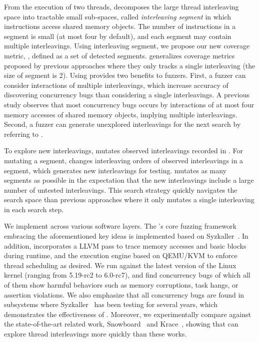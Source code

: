  From the execution of two threads,  
\sys decomposes the large thread interleaving space into tractable 
small sub-spaces, called \textit{interleaving segment} in which
instructions access shared memory objects. The number of instructions 
in a segment is small (at most four by default), and each segment may 
contain multiple interleavings. Using interleaving segment, we propose 
our new coverage metric, \textit{\intcov}, defined as a set of detected segments. \Intcov generalizes coverage 
metrics proposed by previous approaches where they only tracks 
a single interleaving (the size of segment is 2). 
Using \intcov provides two benefits to fuzzers. First, a fuzzer can 
consider interactions of multiple interleavings, which increase 
accuracy of discovering concurrency bugs than considering a single 
interleavings. A previous study\cite{learningfrommistakes} observes that
most concurrency bugs occurs by interactions of at most four memory accesses of shared memory objects, implying multiple interleavings.
Second, a fuzzer can generate unexplored interleavings for the next 
search by referring to \intcov.

 To explore new interleavings,
\sys mutates observed interleavings recorded in \intcov. For mutating a segment, \sys changes interleaving orders of observed interleavings 
in a segment, which generates new interleavings for testing. \sys 
mutates as many segments as possible in the expectation that the 
new interleavings include a large number of untested interleavings. 
This search strategy quickly navigates the search space than previous 
approaches where it only mutates a single interleaving in each search step.



%
We implement \sys across various software layers.
%
The \sys's core fuzzing framework embracing the aforementioned key
ideas is implemented based on Syzkaller~\cite{syzkaller}. In addition,
\sys incorporates a LLVM pass to trace memory accesses and basic
blocks during runtime, and the execution engine based on QEMU/KVM to
enforce thread scheduling as desired.
%
We run \sys against the latest version of the Linux kernel (ranging
from 5.19-rc2 to 6.0-rc7), and find \totalbugs concurrency bugs of
which all of them show harmful behaviors such as memory corruptions,
task hangs, or assertion violations. We also emphasize that all
concurrency bugs are found in subsystems where
Syzkaller~\cite{syzkaller} has been testing for several years, which
demonstrates the effectiveness of \sys.
%
Moreover, we experimentally compare \sys against the state-of-the-art
related work, Snowboard~\cite{snowboard} and Krace~\cite{krace},
showing that \sys can explore thread interleavings more quickly than
these works.





